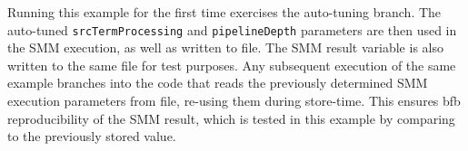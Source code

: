 
   Running this example for the first time exercises the auto-tuning branch. The
   auto-tuned {\tt srcTermProcessing} and {\tt pipelineDepth} parameters are
   then used in the SMM execution, as well as written to file. The SMM result
   variable is also written to the same file for test purposes.
   Any subsequent execution of the same example branches into the code that
   reads the previously determined SMM execution parameters from file, re-using
   them during store-time. This ensures bfb reproducibility of the SMM result, 
   which is tested in this example by comparing to the previously stored value.
\setlength{\parskip}{\oldparskip}
\setlength{\parindent}{\oldparindent}
\setlength{\baselineskip}{\oldbaselineskip}
